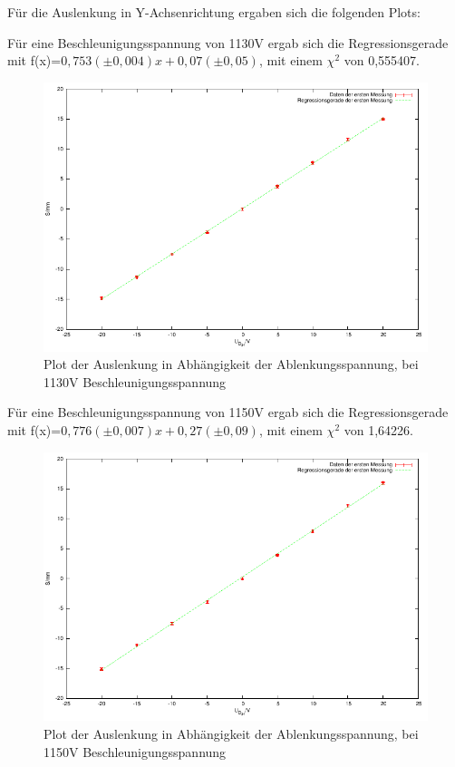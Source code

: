 \documentclass[12pt]{scrartcl}
\begin{document}
\newpage

Für die Auslenkung in Y-Achsenrichtung ergaben sich die folgenden Plots:

Für eine Beschleunigungsspannung von 1130V ergab sich die Regressionsgerade mit f(x)=$0,753 (\pm 0,004) x  + 0,07 (\pm 0,05)$, mit einem $\chi^2$ von 0,555407.

\begin{figure}[htbp] 
  \centering
    \includegraphics[scale = 1]{y_1.pdf}
  	\caption[Plot der Auslenkung in Abhängigkeit der Ablenkungsspannung, bei 1130V Beschleunigungsspannung]{Plot der Auslenkung in Abhängigkeit der Ablenkungsspannung, bei 1130V Beschleunigungsspannung}
  \label{fig:x_1}
\end{figure}



\newpage

Für eine Beschleunigungsspannung von 1150V ergab sich die Regressionsgerade mit f(x)=$0,776 (\pm 0,007) x  + 0,27 (\pm 0,09)$, mit einem $\chi^2$ von 1,64226.

\begin{figure}[htbp] 
  \centering
    \includegraphics[scale = 1]{y_2.pdf}
  	\caption[Plot der Auslenkung in Abhängigkeit der Ablenkungsspannung, bei 1150V Beschleunigungsspannung]{Plot der Auslenkung in Abhängigkeit der Ablenkungsspannung, bei 1150V Beschleunigungsspannung}
  \label{fig:x_1}
\end{figure}
\end{document}
